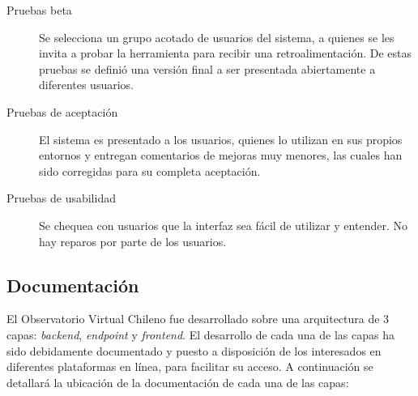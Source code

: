 \begin{description}
\begin{description}
				\begin{description}
					\item[Pruebas beta] Se selecciona un grupo acotado de usuarios del sistema, a quienes se les invita a probar la herramienta para recibir una retroalimentación. De estas pruebas se definió una versión final a ser presentada abiertamente a diferentes usuarios.
					\item[Pruebas de aceptación] El sistema es presentado a los usuarios, quienes lo utilizan en sus propios entornos y entregan comentarios de mejoras muy menores, las cuales han sido corregidas para su completa aceptación.
					\item[Pruebas de usabilidad] Se chequea con usuarios que la interfaz sea fácil de utilizar y entender. No hay reparos por parte de los usuarios.
				\end{description}
		\end{description}
\end{description}

\subsection{Documentación}\label{sec:doc}

El Observatorio Virtual Chileno fue desarrollado sobre una arquitectura de 3 capas: \emph{backend}, \emph{endpoint} y \emph{frontend}. El desarrollo de cada una de las capas ha sido debidamente documentado y puesto a disposición de los interesados en diferentes plataformas en línea, para facilitar su acceso. A continuación se detallará la ubicación de la documentación de cada una de las capas:

